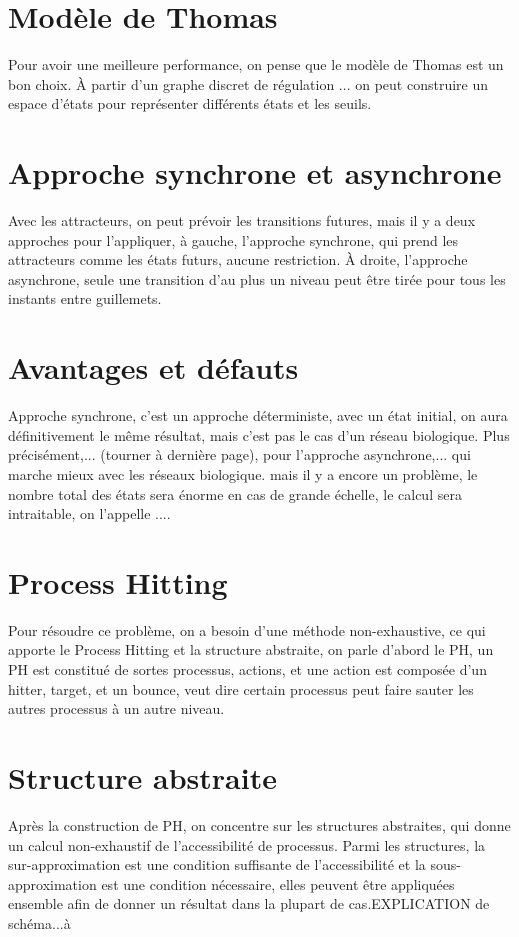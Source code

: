 \documentclass[french,12pt]{article}
\begin{document}
\section{Modèle de Thomas}
Pour avoir une meilleure performance, on pense que le modèle de Thomas est un bon choix. À partir d'un graphe discret de régulation ... on peut construire un espace d'états pour représenter différents états et les seuils.
\section{Approche synchrone et asynchrone}
Avec les attracteurs, on peut prévoir les transitions futures, mais il y a deux approches pour l'appliquer, à gauche, l'approche synchrone, qui prend les attracteurs comme les états futurs, aucune restriction. À droite, l'approche asynchrone, seule une transition d'au plus un niveau peut être tirée pour tous les instants entre guillemets.
\section{Avantages et défauts}
Approche synchrone, c'est un approche déterministe, avec un état initial, on aura définitivement le même résultat, mais c'est pas le cas d'un réseau biologique. Plus précisément,... (tourner à dernière page), pour l'approche asynchrone,... qui marche mieux avec les réseaux biologique. mais il y a encore un problème, le nombre total des états sera énorme en cas de grande échelle, le calcul sera intraitable, on l'appelle ....
\section{Process Hitting}
Pour résoudre ce problème, on a besoin d'une méthode non-exhaustive, ce qui apporte le Process Hitting et la structure abstraite, on parle d'abord le PH, un PH est constitué de sortes processus, actions, et une action est composée d'un hitter, target, et un bounce, veut dire certain processus peut faire sauter les autres processus à un autre niveau.
\section{Structure abstraite}
Après la construction de PH, on concentre sur les structures abstraites, qui donne un calcul non-exhaustif de l'accessibilité de processus. Parmi les structures, la sur-approximation est une condition suffisante de l'accessibilité et la sous-approximation est une condition nécessaire, elles peuvent être appliquées ensemble afin de donner un résultat dans la plupart de cas.EXPLICATION de schéma...à
\end{document}
